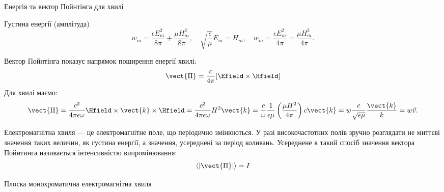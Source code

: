\documentclass[onlytextwidth]{beamer}
\begin{document}
\begin{frame}{Енергія та вектор Пойнтінга для хвилі}{}
\begin{block}{}\justifying

			Густина енергії (амплітуда)
			\begin{equation*}
				w_m = \frac{\epsilon E_m^2}{8\pi} + \frac{\mu H_m^2}{8\pi}, \quad  \sqrt{\frac{\epsilon}{\mu}} E_m = H_m, \quad w_m = \frac{\epsilon
	E_m^2}{4\pi} = \frac{\mu H_m^2}{4\pi}.
			\end{equation*}
\end{block}
\begin{block}{}\justifying
	Вектор Пойнтінга показує напрямок поширення енергії хвилі:
\begin{equation*}
    \vect{\Pi} = \frac{c}{4\pi}[\Efield\times\Hfield]
\end{equation*}
Для хвилі маємо:
\begin{equation*}
	\vect{\Pi} =  \frac{c^2}{4\pi\epsilon \omega} \Hfield\times\vect{k}\times\Hfield = \frac{c^2}{4\pi\epsilon \omega} H^2 \vect{k} =
	\frac{c}{\omega} \frac{1}{\epsilon\mu}\left( \frac{\mu H^2}{4\pi}\right)   c \vect{k} = w \frac{c}{\sqrt{\epsilon\mu}}
	\frac{\vect{k}}{k}= w
	\vec{v}.
\end{equation*}
\end{block}
\begin{block}{}\justifying\small
    Електромагнітна хвиля --- це електромагнітне поле, що періодично змінюються. У разі високочастотних полів зручно розглядати не миттєві значення
    таких величин, як густина енергії, а значення, усереднені за період коливань. Усереднене в такий спосіб значення вектора Пойнтинга називається
    \alert{інтенсивністю випромінювання}:
\begin{equation*}
    \left\langle |\vect{\Pi}| \right\rangle = I
\end{equation*}
\end{block}
\end{frame}



\begin{frame}{Плоска монохроматична електромагнітна хвиля}{}
\begin{center}
    
\end{center}
\end{frame}
\end{document}
